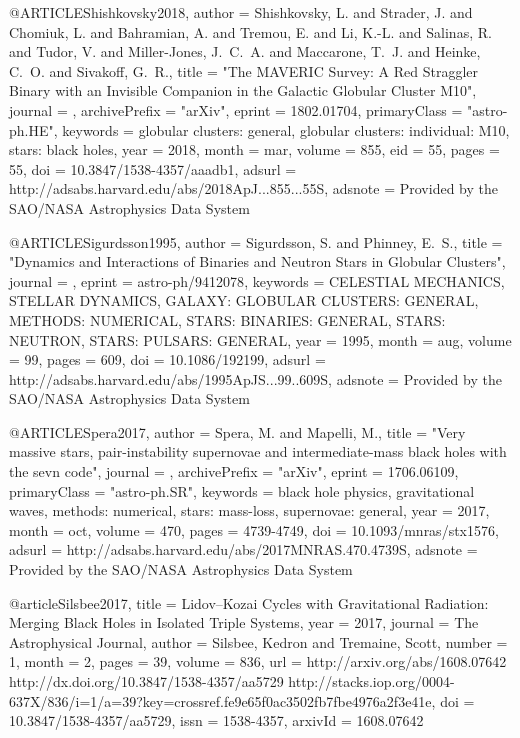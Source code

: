 \documentclass[twocolumn,tighten]{aastex63}
\begin{document}
{{{{{{@ARTICLE{Shishkovsky2018,
   author = {{Shishkovsky}, L. and {Strader}, J. and {Chomiuk}, L. and {Bahramian}, A. and 
	{Tremou}, E. and {Li}, K.-L. and {Salinas}, R. and {Tudor}, V. and 
	{Miller-Jones}, J.~C.~A. and {Maccarone}, T.~J. and {Heinke}, C.~O. and 
	{Sivakoff}, G.~R.},
    title = "{The MAVERIC Survey: A Red Straggler Binary with an Invisible Companion in the Galactic Globular Cluster M10}",
  journal = {\apj},
archivePrefix = "arXiv",
   eprint = {1802.01704},
 primaryClass = "astro-ph.HE",
 keywords = {globular clusters: general, globular clusters: individual: M10, stars: black holes},
     year = 2018,
    month = mar,
   volume = 855,
      eid = {55},
    pages = {55},
      doi = {10.3847/1538-4357/aaadb1},
   adsurl = {http://adsabs.harvard.edu/abs/2018ApJ...855...55S},
  adsnote = {Provided by the SAO/NASA Astrophysics Data System}
}

@ARTICLE{Sigurdsson1995,
   author = {{Sigurdsson}, S. and {Phinney}, E.~S.},
    title = "{Dynamics and Interactions of Binaries and Neutron Stars in Globular Clusters}",
  journal = {\apjs},
   eprint = {astro-ph/9412078},
 keywords = {CELESTIAL MECHANICS, STELLAR DYNAMICS, GALAXY: GLOBULAR CLUSTERS: GENERAL, METHODS: NUMERICAL, STARS: BINARIES: GENERAL, STARS: NEUTRON, STARS: PULSARS: GENERAL},
     year = 1995,
    month = aug,
   volume = 99,
    pages = {609},
      doi = {10.1086/192199},
   adsurl = {http://adsabs.harvard.edu/abs/1995ApJS...99..609S},
  adsnote = {Provided by the SAO/NASA Astrophysics Data System}
}

@ARTICLE{Spera2017,
   author = {{Spera}, M. and {Mapelli}, M.},
    title = "{Very massive stars, pair-instability supernovae and intermediate-mass black holes with the sevn code}",
  journal = {\mnras},
archivePrefix = "arXiv",
   eprint = {1706.06109},
 primaryClass = "astro-ph.SR",
 keywords = {black hole physics, gravitational waves, methods: numerical, stars: mass-loss, supernovae: general},
     year = 2017,
    month = oct,
   volume = 470,
    pages = {4739-4749},
      doi = {10.1093/mnras/stx1576},
   adsurl = {http://adsabs.harvard.edu/abs/2017MNRAS.470.4739S},
  adsnote = {Provided by the SAO/NASA Astrophysics Data System}
}

@article{Silsbee2017,
    title = {{Lidov–Kozai Cycles with Gravitational Radiation: Merging Black Holes in Isolated Triple Systems}},
    year = {2017},
    journal = {The Astrophysical Journal},
    author = {Silsbee, Kedron and Tremaine, Scott},
    number = {1},
    month = {2},
    pages = {39},
    volume = {836},
    url = {http://arxiv.org/abs/1608.07642 http://dx.doi.org/10.3847/1538-4357/aa5729 http://stacks.iop.org/0004-637X/836/i=1/a=39?key=crossref.fe9e65f0ac3502fb7fbe4976a2f3e41e},
    doi = {10.3847/1538-4357/aa5729},
    issn = {1538-4357},
    arxivId = {1608.07642}
}

}}}}}}
\end{document}
